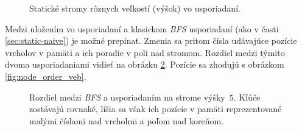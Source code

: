 \begin{figure}
    \hspace{0.5cm}
    \caption{Statické stromy rôznych veľkostí (výšok) vo \vEB usporiadaní.}
    \label{fig:ss_static_sizes}
\end{figure}

Medzi uložením vo \vEB usporiadaní a klasickom \emph{BFS} usporiadaní (ako v časti \ref{sec:static-naive}) je možné prepínať. Zmenia sa pritom čísla udávajúce pozície vrcholov v pamäti a ich poradie v poli nad stromom. Rozdiel medzi týmito dvoma usporiadaniami vidieť na obrázku \ref{fig:ss_static_order}. Pozície sa zhodujú s obrázkom \ref{fig:node_order_veb}.

\begin{figure}
    \centering
    \caption{Rozdiel medzi \emph{BFS} a \vEB usporiadaním na strome výšky~$5$. Kľúče zostávajú rovnaké, líšia sa však ich pozície v pamäti reprezentované malými číslami nad vrcholmi a poľom nad koreňom.}
    \label{fig:ss_static_order}
\end{figure}

